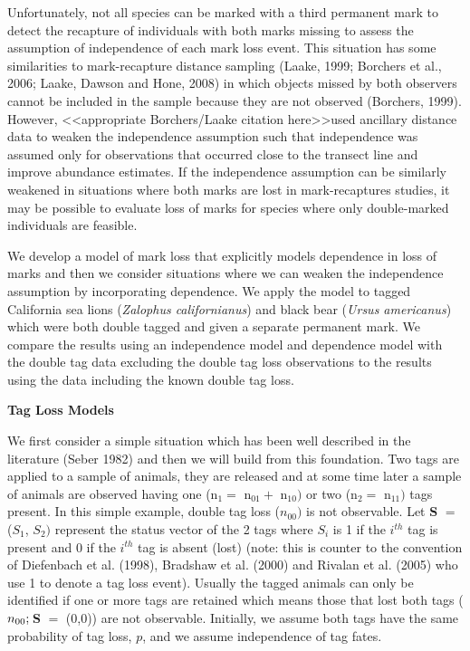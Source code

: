\documentclass{article}
\begin{document}
Unfortunately, not all species can be marked with a third permanent mark to 
detect the recapture of individuals with both marks missing to assess the 
assumption of independence of each mark loss event. This situation has some 
similarities to mark-recapture distance sampling (Laake, 1999; Borchers et 
al., 2006; Laake, Dawson and Hone, 2008) in which objects missed by both 
observers cannot be included in the sample because they are not observed 
(Borchers, 1999). However, \textless \textless appropriate Borchers/Laake 
citation here\textgreater \textgreater used ancillary distance data to 
weaken the independence assumption such that independence was assumed only 
for observations that occurred close to the transect line and improve 
abundance estimates. If the independence assumption can be similarly 
weakened in situations where both marks are lost in mark-recaptures studies, 
it may be possible to evaluate loss of marks for species where only 
double-marked individuals are feasible.

We develop a model of mark loss that explicitly models dependence in loss of 
marks and then we consider situations where we can weaken the independence 
assumption by incorporating dependence. We apply the model to tagged 
California sea lions (\textit{Zalophus californianus}) and black bear (\textit{Ursus americanus}) which were both double tagged and 
given a separate permanent mark. We compare the results using an 
independence model and dependence model with the double tag data excluding 
the double tag loss observations to the results using the data including the 
known double tag loss.

\textbf{Tag Loss Models}

We first consider a simple situation which has been well described in the 
literature (Seber 1982) and then we will build from this foundation. Two 
tags are applied to a sample of animals, they are released and at some time 
later a sample of animals are observed having one (n$_{\mathrm{1}}=$ 
n$_{\mathrm{01}}+$ n$_{\mathrm{10}})$ or two (n$_{\mathrm{2}}=$ 
n$_{\mathrm{11}})$ tags present. In this simple example, double tag loss 
($n_{00})$ is not observable. Let \textbf{S} $=$ ($S_{\mathrm{1}}$, 
$S_{\mathrm{2}})$ represent the status vector of the 2 tags where $S_{i}$ is 1 
if the $i^{th}$ tag is present and 0 if the $i^{th}$ tag is absent (lost) 
(note: this is counter to the convention of Diefenbach et al. (1998), 
Bradshaw et al. (2000) and Rivalan et al. (2005) who use 1 to denote a tag 
loss event). Usually the tagged animals can only be identified if one or 
more tags are retained which means those that lost both tags 
($n_{00};\thinspace $\textbf{S} $=$ (0,0)) are not observable. Initially, we 
assume both tags have the same probability of tag loss, $p$, and we assume 
independence of tag fates. 
\end{document}

